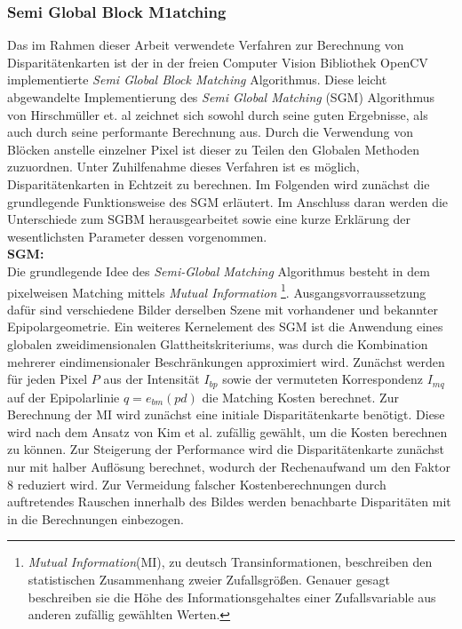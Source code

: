 \subsubsection{Semi Global Block M1atching}
\label{subsec:stereo_matching_sgbm}
Das im Rahmen dieser Arbeit verwendete Verfahren zur Berechnung von Disparitätenkarten ist der in der freien Computer Vision Bibliothek OpenCV \cite{opencv} implementierte \emph{Semi Global Block Matching} Algorithmus. Diese leicht abgewandelte Implementierung des \emph{Semi Global Matching} (SGM) Algorithmus von Hirschmüller et. al \cite{hirschmuller2005sgm} zeichnet sich sowohl durch seine guten Ergebnisse, als auch durch seine performante Berechnung aus. Durch die Verwendung von Blöcken anstelle einzelner Pixel ist dieser zu Teilen den Globalen Methoden zuzuordnen. Unter Zuhilfenahme dieses Verfahren ist es möglich, Disparitätenkarten in Echtzeit zu berechnen. Im Folgenden wird zunächst die grundlegende Funktionsweise des SGM erläutert. Im Anschluss daran werden die Unterschiede zum SGBM herausgearbeitet sowie eine kurze Erklärung der wesentlichsten Parameter dessen vorgenommen.\\

\noindent
\textbf{SGM:} \\
Die grundlegende Idee des \emph{Semi-Global Matching} Algorithmus besteht in dem pixelweisen Matching mittels \emph{Mutual Information} \footnote{\emph{Mutual Information}(MI), zu deutsch Transinformationen, beschreiben den statistischen Zusammenhang zweier Zufallsgrößen. Genauer gesagt beschreiben sie die Höhe des Informationsgehaltes einer Zufallsvariable aus anderen zufällig gewählten Werten.}. Ausgangsvorraussetzung dafür sind verschiedene Bilder derselben Szene mit vorhandener und bekannter Epipolargeometrie. Ein weiteres Kernelement des SGM ist die Anwendung eines globalen zweidimensionalen Glattheitskriteriums, was durch die Kombination mehrerer eindimensionaler Beschränkungen approximiert wird. Zunächst werden für jeden Pixel $P$ aus der Intensität $I_{bp}$ sowie der vermuteten Korrespondenz $I_{mq}$ auf der Epipolarlinie $q=e_{bm}(pd)$ die Matching Kosten berechnet. Zur Berechnung der MI wird zunächst eine initiale Disparitätenkarte benötigt. Diese wird nach dem Ansatz von Kim et al. \cite{kim2003visual} zufällig gewählt, um die Kosten berechnen zu können. Zur Steigerung der Performance wird die Disparitätenkarte zunächst nur mit halber Auflösung berechnet, wodurch der Rechenaufwand um den Faktor $8$ reduziert wird. Zur Vermeidung falscher Kostenberechnungen durch auftretendes Rauschen innerhalb des Bildes werden benachbarte Disparitäten mit in die Berechnungen einbezogen.\\

